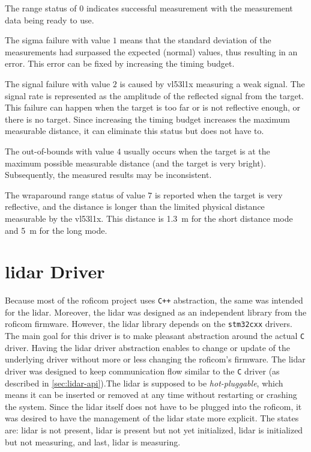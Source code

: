 \documentclass[
  digital,     %
  oneside,     %
  nosansbold,  %
  nocolorbold, %
  nolof,         %
  nolot,         %
]{fithesis4}
\begin{document}
The range status of $0$ indicates successful measurement with the measurement data being ready to
use.

The sigma failure with value $1$ means that the standard deviation of the measurements had surpassed
the expected (normal) values, thus resulting in an error. This error can be fixed by increasing the
timing budget.

The signal failure with value $2$ is caused by \gls{vl53l1x} measuring a weak signal. The signal
rate is represented as the amplitude of the reflected signal from the target. This failure can
happen when the target is too far or is not reflective enough, or there is no target. Since
increasing the timing budget increases the maximum measurable distance, it can eliminate this status
but does not have to.

The out-of-bounds with value $4$ usually occurs when the target is at the maximum possible
measurable distance (and the target is very bright). Subsequently, the measured results may be
inconsistent.

The wraparound range status of value $7$ is reported when the target is very reflective, and the
distance is longer than the limited physical distance measurable by the \gls{vl53l1x}. This distance
is \qty{1.3}{\metre} for the short distance mode and \qty{5}{\metre} for the long mode.

\section[ LiDAR Diver ]{ \acrshort{lidar} Driver } \label{sec:lidar-driver}

Because most of the \acrshort{roficom} project uses \verb|C++| abstraction, the same was intended
for the \acrshort{lidar}. Moreover, the \acrshort{lidar} was designed as an independent library from
the \acrshort{roficom} firmware. However, the \acrshort{lidar} library depends on the
\texttt{stm32cxx} drivers. The main goal for this driver is to make pleasant abstraction around the
actual \verb|C| driver. Having the \acrshort{lidar} driver abstraction enables to change or update
of the underlying driver without more or less changing the \acrshort{roficom}'s firmware. The
\acrshort{lidar} driver was designed to keep communication flow similar to the \verb|C| driver (as
described in \autoref{sec:lidar-api}).The \acrshort{lidar} is supposed to be \emph{hot-pluggable},
which means it can be inserted or removed at any time without restarting or crashing the system.
Since the \acrshort{lidar} itself does not have to be plugged into the \acrshort{roficom}, it was
desired to have the management of the \acrshort{lidar} state more explicit. The states are:
\acrshort{lidar} is not present, \acrshort{lidar} is present but not yet initialized,
\acrshort{lidar} is initialized but not measuring, and last, \acrshort{lidar} is measuring. 
\end{document}
